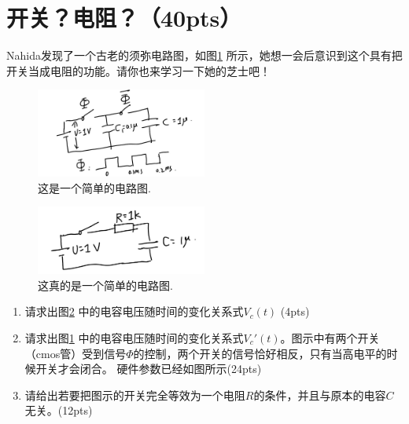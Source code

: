 \section{开关？电阻？（40pts）}
Nahida发现了一个古老的须弥电路图，如图\ref{switch} 所示，她想一会后意识到这个具有把开关当成电阻的功能。请你也来学习一下她的芝士吧！
\begin{figure}[htbp]
	\centering
	\includegraphics[width=0.5\textwidth]{switch}
	\caption{这是一个简单的电路图.}
	\label{switch}
\end{figure}
\begin{figure}[htbp]
	\centering
	\includegraphics[width=0.5\textwidth]{RC}
	\caption{这真的是一个简单的电路图.}
	\label{RC}
\end{figure}
\begin{enumerate}
	\item 请求出图\ref{RC} 中的电容电压随时间的变化关系式\(V_c(t)\) (4pts)
	\item 请求出图\ref{switch} 中的电容电压随时间的变化关系式\(V_c'(t)\)。图示中有两个开关（cmos管）受到信号\(\Phi\)的控制，两个开关的信号恰好相反，只有当高电平的时候开关才会闭合。 硬件参数已经如图所示(24pts)
	\item 请给出若要把图示的开关完全等效为一个电阻\(R\)的条件，并且与原本的电容\(C\)无关。(12pts)
\end{enumerate}

